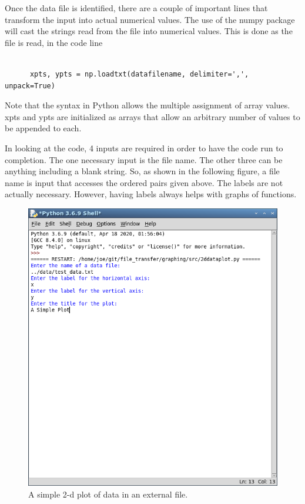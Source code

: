 \documentclass[10pt,fleqn]{article}
\begin{document}
Once the data file is identified, there are a couple of important lines that
transform the input into actual numerical values. The use of the numpy package
will cast the strings read from the file into numerical values. This is done
as the file is read, in the code line
\begin{verbatim}

      xpts, ypts = np.loadtxt(datafilename, delimiter=',', unpack=True)

\end{verbatim}
Note that the syntax in Python allows the multiple assignment of array values.
xpts and ypts are initialized as arrays that allow an arbitrary number of values
to be appended to each.

In looking at the code, 4 inputs are required in order to have the code run to
completion. The one necessary input is the file name. The other three can be
anything including a blank string. So, as shown in the following figure, a file
name is input that accesses the ordered pairs given above. The labels are not
actually necessary. However, having labels always helps with graphs of
functions.
\vfill
\begin{figure}[h]
\centering
\includegraphics[width=6.0in]{../images/2ddataplot_02.png}
\vskip0.1in
\caption{A simple 2-d plot of data in an external file.}
\end{figure}
\eject
\end{document}
